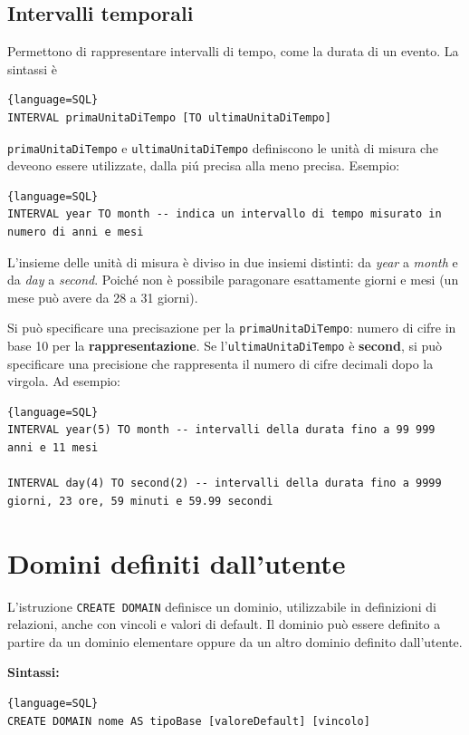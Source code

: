 \documentclass[11pt]{report}
\begin{document}
\subsection{Intervalli temporali}
Permettono di rappresentare intervalli di tempo, come la durata di un evento. La sintassi \`e
\begin{lstlisting}{language=SQL}
INTERVAL primaUnitaDiTempo [TO ultimaUnitaDiTempo]
\end{lstlisting}
\texttt{primaUnitaDiTempo} e \texttt{ultimaUnitaDiTempo} definiscono le unit\`a di misura che deveono essere utilizzate, dalla pi\'u precisa alla meno precisa. Esempio:
\begin{lstlisting}{language=SQL}
INTERVAL year TO month -- indica un intervallo di tempo misurato in numero di anni e mesi
\end{lstlisting}

L'insieme delle unit\`a di misura \`e diviso in due insiemi distinti: da \emph{year} a \emph{month} e da \emph{day} a \emph{second}.
Poich\'e non \`e possibile paragonare esattamente giorni e mesi (un mese pu\`o avere da 28 a 31 giorni).

Si pu\`o specificare una precisazione per la \texttt{primaUnitaDiTempo}: numero di cifre in base 10 per la \textbf{rappresentazione}.
Se l'\texttt{ultimaUnitaDiTempo} \`e \textbf{second}, si pu\`o specificare una precisione che rappresenta il numero di cifre decimali dopo la virgola. Ad esempio:
\begin{lstlisting}{language=SQL}
INTERVAL year(5) TO month -- intervalli della durata fino a 99 999 anni e 11 mesi

INTERVAL day(4) TO second(2) -- intervalli della durata fino a 9999 giorni, 23 ore, 59 minuti e 59.99 secondi
\end{lstlisting}

\section{Domini definiti dall'utente}

L'istruzione \texttt{CREATE DOMAIN} definisce un dominio, utilizzabile in definizioni di relazioni, anche con vincoli e valori di default. Il dominio pu\`o essere definito a partire da un dominio elementare oppure da un altro dominio definito dall'utente. 

\textbf{Sintassi:}
\begin{lstlisting}{language=SQL}
CREATE DOMAIN nome AS tipoBase [valoreDefault] [vincolo]
\end{lstlisting}
\end{document}
